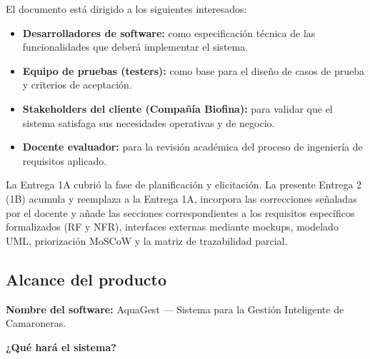 \documentclass[11pt,a4paper]{article}
\begin{document}
El documento está dirigido a los siguientes interesados:

\begin{itemize}
    \item \textbf{Desarrolladores de software:} como especificación técnica de las funcionalidades que deberá implementar el sistema.
    \item \textbf{Equipo de pruebas (testers):} como base para el diseño de casos de prueba y criterios de aceptación.
    \item \textbf{Stakeholders del cliente (Compañía Biofina):} para validar que el sistema satisfaga sus necesidades operativas y de negocio.
    \item \textbf{Docente evaluador:} para la revisión académica del proceso de ingeniería de requisitos aplicado.
\end{itemize}

La Entrega 1A cubrió la fase de planificación y elicitación. La presente Entrega 2 (1B) acumula y reemplaza a la Entrega 1A, incorpora las correcciones señaladas por el docente y añade las secciones correspondientes a los requisitos específicos formalizados (RF y NFR), interfaces externas mediante mockups, modelado UML, priorización MoSCoW y la matriz de trazabilidad parcial.

\subsection{Alcance del producto}

\textbf{Nombre del software:} AquaGest --- Sistema para la Gestión Inteligente de Camaroneras.

\vspace{0.3cm}

\textbf{¿Qué hará el sistema?}
\end{document}
